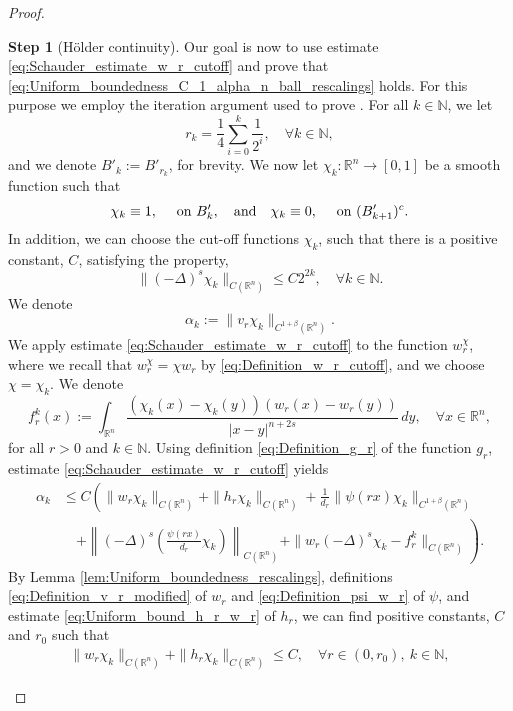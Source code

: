 \documentclass[11pt,reqno]{amsart}
\theoremstyle{definition}
\newtheorem{step}{Step}
\theoremstyle{remark}
\begin{document}
\begin{proof}
\begin{step}[H\"older continuity]
\label{step:Holder_continuity}
Our goal is now to use estimate \eqref{eq:Schauder_estimate_w_r_cutoff} and prove that \eqref{eq:Uniform_boundedness_C_1_alpha_n_ball_rescalings} holds. For this purpose we employ the iteration argument used to prove \cite[Theorem 8.11.1]{Krylov_LecturesHolder}. For all $k \in {\mathbb{N}}$, we let
$$
r_k=\frac{1}{4}\sum_{i=0}^k \frac{1}{2^i},\quad\forall k\in{\mathbb{N}},
$$
and we denote $B'_k:=B'_{r_k}$, for brevity. We now let $\chi_k:{\mathbb{R}}^n\rightarrow[0,1]$ be a smooth function such that 
$$
\chi_k \equiv 1,\quad\hbox{ on } B'_k,\quad\hbox{and}\quad \chi_k\equiv 0, \quad\hbox{ on } (B'_{k+1})^c.
$$
In addition, we can choose the cut-off functions $\chi_k$, such that there is a positive constant, $C$, satisfying the property, 
\begin{equation}
\label{eq:Fractional_laplacian_cutoff}
\|(-\Delta)^s\chi_k\|_{C({\mathbb{R}}^n)} \leq C 2^{2k},\quad\forall k \in {\mathbb{N}}.
\end{equation}
We denote
$$
\alpha_k:=\|v_r\chi_k\|_{C^{1+\beta}({\mathbb{R}}^n)}.
$$
We apply estimate \eqref{eq:Schauder_estimate_w_r_cutoff} to the function $w^{\chi}_r$, where we recall that $w^{\chi}_r=\chi w_r$ by \eqref{eq:Definition_w_r_cutoff}, and we choose $\chi=\chi_k$. We denote 
\begin{equation}
\label{eq:Definition_f_r}
f^k_r(x):=\int_{{\mathbb{R}}^n}\frac{(\chi_k(x)-\chi_k(y))(w_r(x)-w_r(y))}{|x-y|^{n+2s}}\, dy,\quad\forall x \in {\mathbb{R}}^n,
\end{equation}
for all $r>0$ and $k \in {\mathbb{N}}$. Using definition \eqref{eq:Definition_g_r} of the function $g_r$, estimate \eqref{eq:Schauder_estimate_w_r_cutoff} yields
\begin{align*}
\alpha_k &\leq C\left(\|w_r\chi_k\|_{C({\mathbb{R}}^n)} + \|h_r\chi_k\|_{C({\mathbb{R}}^n)} + \frac{1}{d_r}\|\psi(rx)\chi_k\|_{C^{1+\beta}({\mathbb{R}}^n)}\right.\\
&\quad\left. +\left\|(-\Delta)^s\left(\frac{\psi(rx)}{d_r}\chi_k\right)\right\|_{C({\mathbb{R}}^n)}
+\|w_r(-\Delta)^s\chi_k - f^k_r\|_{C({\mathbb{R}}^n)} \right).
\end{align*}
By Lemma \ref{lem:Uniform_boundedness_rescalings}, definitions \eqref{eq:Definition_v_r_modified} of $w_r$ and \eqref{eq:Definition_psi_w_r} of $\psi$, and estimate \eqref{eq:Uniform_bound_h_r_w_r} of $h_r$, we can find positive constants, $C$ and $r_0$ such that
\begin{align*}
\|w_r\chi_k\|_{C({\mathbb{R}}^n)} + \|h_r\chi_k\|_{C({\mathbb{R}}^n)} \leq C,\quad\forall r\in(0,r_0),\ k \in {\mathbb{N}},

\end{align*}
\end{step}
\end{proof}
\end{document}
